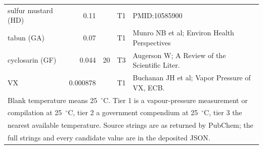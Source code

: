 \begin{tabular}{lrccl}
sulfur mustard (HD) & 0.11 &  & T1 & PMID:10585900 \\
tabun (GA) & 0.07 &  & T1 & Munro NB et al; Environ Health Perspectives \\
cyclosarin (GF) & 0.044 & 20 & T3 & Augerson W; A Review of the Scientific Liter. \\
VX & 0.000878 &  & T1 & Buchanan JH et al; Vapor Pressure of VX, ECB. \\
\hline
\multicolumn{5}{l}{\footnotesize Blank temperature means 25~$^{\circ}$C. Tier 1 is a vapour-pressure measurement or}\\
\multicolumn{5}{l}{\footnotesize compilation at 25~$^{\circ}$C, tier 2 a government compendium at 25~$^{\circ}$C, tier 3 the}\\
\multicolumn{5}{l}{\footnotesize nearest available temperature. Source strings are as returned by PubChem; the}\\
\multicolumn{5}{l}{\footnotesize full strings and every candidate value are in the deposited JSON.}\\
\end{tabular}
